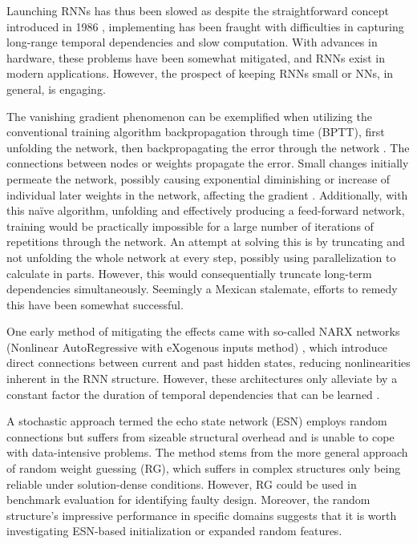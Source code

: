 Launching RNNs has thus been slowed as despite the straightforward concept introduced in 1986 \cite{RNN1}, implementing has been fraught with difficulties in capturing long-range temporal dependencies and slow computation. With advances in hardware, these problems have been somewhat mitigated, and RNNs exist in modern applications. However, the prospect of keeping RNNs small or NNs, in general, is engaging.

The vanishing gradient phenomenon can be exemplified when utilizing the conventional training algorithm backpropagation through time (BPTT), first unfolding the network, then backpropagating the error through the network \cite{DRNNS}. The connections between nodes or weights propagate the error. Small changes initially permeate the network, possibly causing exponential diminishing or increase of individual later weights in the network, affecting the gradient \cite{field}. Additionally, with this naïve algorithm, unfolding and effectively producing a feed-forward network, training would be practically impossible for a large number of iterations of repetitions through the network. An attempt at solving this is by truncating and not unfolding the whole network at every step, possibly using parallelization to calculate in parts. However, this would consequentially truncate long-term dependencies simultaneously. Seemingly a Mexican stalemate, efforts to remedy this have been somewhat successful. 

One early method of mitigating the effects came with so-called NARX networks (Nonlinear AutoRegressive with eXogenous inputs method) \cite{DRNNS}, which introduce direct connections between current and past hidden states, reducing nonlinearities inherent in the RNN structure. However, these architectures only alleviate by a constant factor the duration of temporal dependencies that can be learned \cite{suts}.

A stochastic approach termed the echo state network (ESN) employs random connections but suffers from sizeable structural overhead and is unable to cope with data-intensive problems. The method stems from the more general approach of random weight guessing (RG), which suffers in complex structures only being reliable under solution-dense conditions. However, RG could be used in benchmark evaluation for identifying faulty design. Moreover, the random structure's impressive performance in specific domains suggests that it is worth investigating ESN-based initialization \cite{suts} or expanded random features. 

